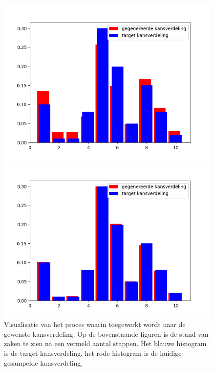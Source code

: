\begin{figure}
\begin{minipage}{0.49\linewidth}
        \includegraphics[width=\linewidth]{Figures/goede_visualisatie_legende/visualisatie_540.png} 
    \end{minipage}
    \hfill
    \begin{minipage}{0.49\linewidth}
        \includegraphics[width=\linewidth]{Figures/goede_visualisatie_legende/visualisatie_99999.png}
    \end{minipage}
\caption{Visualisatie van het proces waarin toegewerkt wordt naar de gewenste kansverdeling. Op de bovenstaande figuren is de stand van zaken te zien na een vermeld aantal stappen. Het blauwe histogram is de target kansverdeling, het rode histogram is de huidige gesampelde kansverdeling.}
\label{fig: visualisatie_metropolis}
\end{figure}

